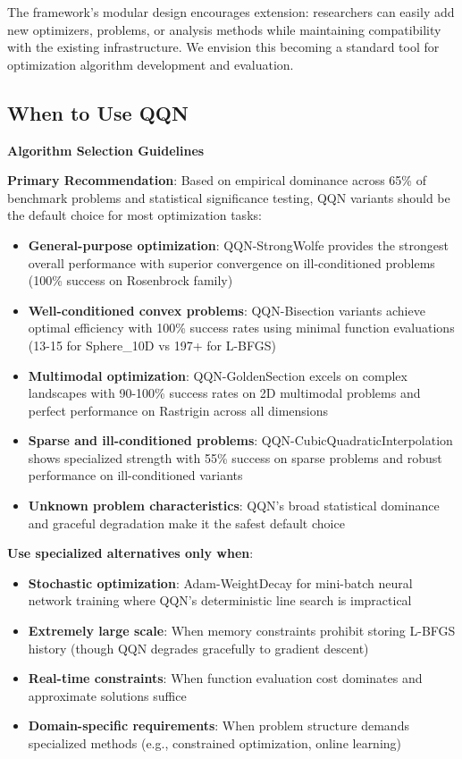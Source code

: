 The framework's modular design encourages extension: researchers can easily add new optimizers, problems, or analysis methods while maintaining compatibility with the existing infrastructure. We envision this becoming a standard tool for optimization algorithm development and evaluation.

\hypertarget{when-to-use-qqn}{%
\subsection{When to Use QQN}\label{when-to-use-qqn}}

\textbf{Algorithm Selection Guidelines}

\textbf{Primary Recommendation}: Based on empirical dominance across 65\% of benchmark problems and statistical significance testing, QQN variants should be the default choice for most optimization tasks:

\begin{itemize}
\tightlist
\item
  \textbf{General-purpose optimization}: QQN-StrongWolfe provides the strongest overall performance with superior convergence on ill-conditioned problems (100\% success on Rosenbrock family)
\item
  \textbf{Well-conditioned convex problems}: QQN-Bisection variants achieve optimal efficiency with 100\% success rates using minimal function evaluations (13-15 for Sphere\_10D vs 197+ for L-BFGS)
\item
  \textbf{Multimodal optimization}: QQN-GoldenSection excels on complex landscapes with 90-100\% success rates on 2D multimodal problems and perfect performance on Rastrigin across all dimensions
\item
  \textbf{Sparse and ill-conditioned problems}: QQN-CubicQuadraticInterpolation shows specialized strength with 55\% success on sparse problems and robust performance on ill-conditioned variants
\item
  \textbf{Unknown problem characteristics}: QQN's broad statistical dominance and graceful degradation make it the safest default choice
\end{itemize}

\textbf{Use specialized alternatives only when}:

\begin{itemize}
\tightlist
\item
  \textbf{Stochastic optimization}: Adam-WeightDecay for mini-batch neural network training where QQN's deterministic line search is impractical
\item
  \textbf{Extremely large scale}: When memory constraints prohibit storing L-BFGS history (though QQN degrades gracefully to gradient descent)
\item
  \textbf{Real-time constraints}: When function evaluation cost dominates and approximate solutions suffice
\item
  \textbf{Domain-specific requirements}: When problem structure demands specialized methods (e.g., constrained optimization, online learning)
\end{itemize}

